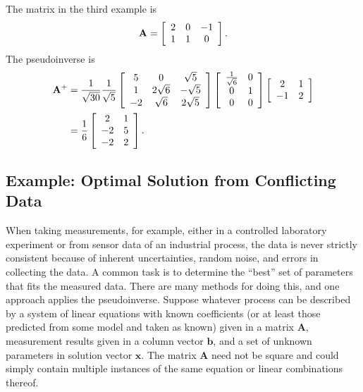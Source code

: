 The matrix in the third example is
\begin{align}
  \mathbf{A} = \left[ \begin{array}{c c c}
   2 &  0 & -1 \\
   1 &  1 &  0 \\ \end{array} \right] . \nonumber
\end{align}
The pseudoinverse is
\begin{align}
  \mathbf{A}^+ &= 
  \frac{1}{\sqrt{30}} \frac{1}{\sqrt{5}}  \left[ \begin{array}{c c c}
   5 &  0 			&   \sqrt{5} \\
   1 &  2\sqrt{6} 	&  -\sqrt{5} \\
  -2 &   \sqrt{6} 	&  2\sqrt{5} \\ \end{array} \right] 
  \left[ \begin{array}{c c}
  \frac{1}{\sqrt{6}}	& 0		\\
  0						& 1		\\ 
  0						& 0		\\ \end{array} \right] 
  \left[ \begin{array}{c c}
  2		&  1	\\
 -1		&  2	\\ \end{array} \right] \nonumber \\
 &= \frac{1}{6} \left[ \begin{array}{c c}
   2 &  1 \\
  -2 &  5 \\ 
  -2 &  2 \\ \end{array} \right] .
\end{align}

\subsection{Example: Optimal Solution from Conflicting Data}

When taking measurements, for example, either in a controlled laboratory experiment or from sensor data of an industrial process, the data is never strictly consistent because of inherent uncertainties, random noise, and errors in collecting the data. A common task is to determine the ``best'' set of parameters that fits the measured data. There are many methods for doing this, and one approach applies the pseudoinverse. Suppose whatever process can be described by a system of linear equations with known coefficients (or at least those predicted from some model and taken as known) given in a matrix $\mathbf{A}$, measurement results given in a column vector $\mathbf{b}$, and a set of unknown parameters in solution vector $\mathbf{x}$. The matrix $\mathbf{A}$ need not be square and could simply contain multiple instances of the same equation or linear combinations thereof. 


